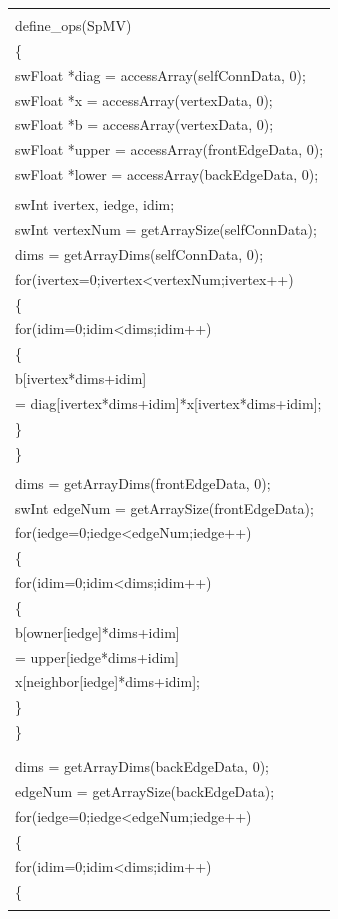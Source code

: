 \documentclass[conference]{IEEEtran}
\begin{document}
\begin{table}[]
\begin{tabular}{l}
\begin{tabular}[c]{@{}l@{}}// define the SpMV wrapper interface\\ define\_ops(SpMV)\\ \{\\ \qquad swFloat *diag  = accessArray(selfConnData, 0);\\ \qquad swFloat *x     = accessArray(vertexData, 0);\\ \qquad swFloat *b     = accessArray(vertexData, 0);\\ \qquad swFloat *upper = accessArray(frontEdgeData, 0);\\ \qquad swFloat *lower = accessArray(backEdgeData, 0);\\         \\ \qquad swInt ivertex, iedge, idim;\\ \qquad swInt vertexNum = getArraySize(selfConnData);\\ \qquad dims = getArrayDims(selfConnData, 0);\\ \qquad for(ivertex=0;ivertex\textless{}vertexNum;ivertex++)\\ \qquad \{\\ \qquad \qquad for(idim=0;idim\textless{}dims;idim++)\\ \qquad \qquad \{\\ \qquad \qquad \qquad b{[}ivertex*dims+idim{]} \\ \qquad \qquad \qquad \qquad = diag{[}ivertex*dims+idim{]}*x{[}ivertex*dims+idim{]};\\ \qquad \qquad \}\\ \qquad \}\\ \\ \qquad dims = getArrayDims(frontEdgeData, 0);\\ \qquad swInt edgeNum = getArraySize(frontEdgeData);\\ \qquad for(iedge=0;iedge\textless{}edgeNum;iedge++)\\ \qquad \{\\ \qquad \qquad for(idim=0;idim\textless{}dims;idim++)\\ \qquad \qquad \{\\ \qquad \qquad \qquad b{[}owner{[}iedge{]}*dims+idim{]}\\ \qquad \qquad \qquad \qquad = upper{[}iedge*dims+idim{]}\\ \qquad \qquad \qquad \qquad * x{[}neighbor{[}iedge{]}*dims+idim{]};\\ \qquad \qquad \}\\ \qquad \}\\ \\ \\       \qquad    dims = getArrayDims(backEdgeData, 0);\\    \qquad  edgeNum = getArraySize(backEdgeData);\\      \qquad for(iedge=0;iedge\textless{}edgeNum;iedge++)\\   \qquad     \{\\        \qquad \qquad for(idim=0;idim\textless{}dims;idim++)\\   \qquad \qquad      \{\\            \qquad \qquad \qquad 
\end{tabular}
\end{table}
\end{document}
